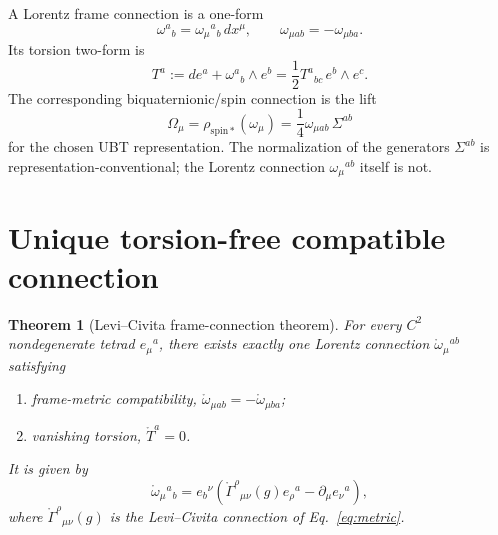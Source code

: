 \documentclass[12pt,a4paper]{article}
\newtheorem{theorem}[definition]{Theorem}
\theoremstyle{remark}\newtheorem{remark}[definition]{Remark}
\begin{document}
A Lorentz frame connection is a one-form
\begin{equation}
 \omega^a{}_b=\omega_\mu{}^a{}_b\,dx^\mu,
 \qquad \omega_{\mu ab}=-\omega_{\mu ba}.
\end{equation}
Its torsion two-form is
\begin{equation}
 T^a:=de^a+\omega^a{}_b\wedge e^b
      =\frac12T^a{}_{bc}\,e^b\wedge e^c.
 \label{eq:torsion}
\end{equation}
The corresponding biquaternionic/spin connection is the lift
\begin{equation}
 \Omega_\mu=\rho_{\mathrm{spin}*}(\omega_\mu)
 =\frac14\omega_{\mu ab}\,\Sigma^{ab}
 \label{eq:spinlift}
\end{equation}
for the chosen UBT representation.  The normalization of the generators
$\Sigma^{ab}$ is representation-conventional; the Lorentz connection
$\omega_\mu{}^{ab}$ itself is not.

\section{Unique torsion-free compatible connection}
\begin{theorem}[Levi--Civita frame-connection theorem]
\label{thm:unique-omega}
For every $C^2$ nondegenerate tetrad $e_\mu{}^a$, there exists exactly one
Lorentz connection $\mathring\omega_\mu{}^{ab}$ satisfying
\begin{enumerate}
 \item frame-metric compatibility,
       $\mathring\omega_{\mu ab}=-\mathring\omega_{\mu ba}$;
 \item vanishing torsion, $\mathring T^a=0$.
\end{enumerate}
It is given by
\begin{equation}
 \boxed{
 \mathring\omega_\mu{}^a{}_b
 =e_b{}^\nu\left(
 \mathring\Gamma^\rho{}_{\mu\nu}(g)e_\rho{}^a
 -\partial_\mu e_\nu{}^a
 \right),}
 \label{eq:omega-explicit}
\end{equation}
where $\mathring\Gamma^\rho{}_{\mu\nu}(g)$ is the Levi--Civita connection of
Eq.~\eqref{eq:metric}.
\end{theorem}
\end{document}

